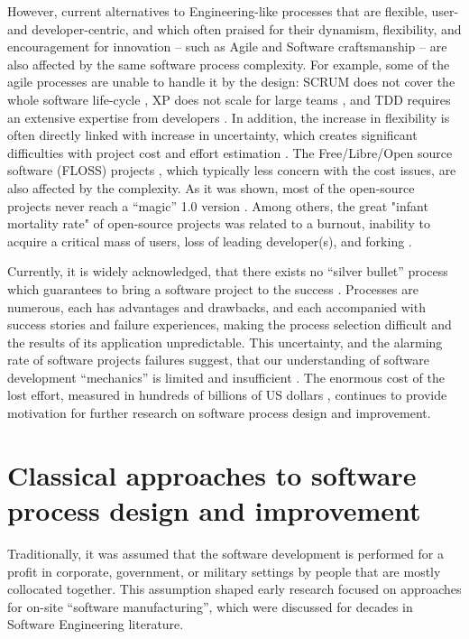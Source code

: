 However, current alternatives to Engineering-like processes that are flexible, user- and developer-centric,
and which often praised for their dynamism, flexibility, and encouragement for innovation --
such as Agile and Software craftsmanship -- are also affected by the same software process complexity. 
For example, some of the agile processes are unable to handle it by the design: 
SCRUM does not cover the whole software life-cycle \cite{Cohn_SCRUM}, 
XP does not scale for large teams \cite{Beck_XP}, 
and TDD requires an extensive expertise from developers \cite{Beck_TDD}.
In addition, the increase in flexibility is often directly linked with increase in uncertainty, which creates 
significant difficulties with project cost and effort estimation \cite{citeulike:12933080} \cite{citeulike:9928907}.
The Free/Libre/Open source software (FLOSS) projects , which typically less concern with the cost issues, 
are also affected by the complexity. 
As it was shown, most of the open-source projects never reach a ``magic'' 1.0 version 
\cite{citeulike:12480029}. Among others, the great "infant mortality rate" of open-source 
projects was related to a burnout, inability to acquire a critical mass of users, loss of leading developer(s), 
and forking \cite{richter2007critique}. 

Currently, it is widely acknowledged, that there exists no ``silver bullet'' process which 
guarantees to bring a software project to the success \cite{citeulike:1986013}. 
Processes are numerous, each has advantages and drawbacks, and each accompanied with 
success stories and failure experiences, making the process selection difficult 
and the results of its application unpredictable.
This uncertainty, and the alarming rate of software projects failures suggest, that our understanding 
of software development ``mechanics'' is limited and insufficient \cite{citeulike:12550665}. 
The enormous cost of the lost effort, measured in hundreds of billions of US dollars 
\cite{citeulike:2207657} \cite{citeulike:2207653} \cite{citeulike:2207655}, 
continues to provide motivation for further research on software process design and improvement. 

%
%
\section{Classical approaches to software process design and improvement}\label{section_software_process_design}
Traditionally, it was assumed that the software development is performed for a profit in 
corporate, government, or military settings by people that are mostly collocated together. 
This assumption shaped early research focused on approaches for on-site ``software manufacturing'',
which were discussed for decades in Software Engineering literature. 

